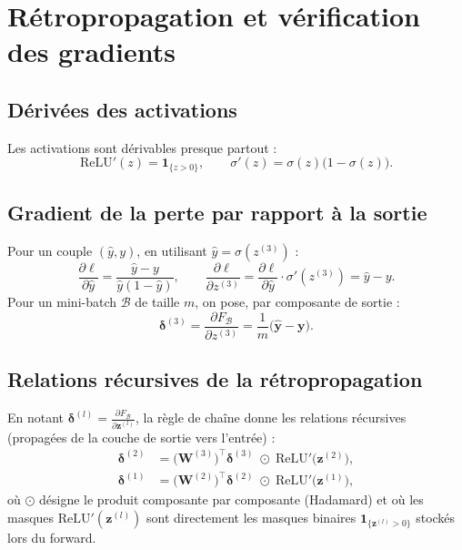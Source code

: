 \documentclass[11pt,a4paper]{article}
\newcommand{\pfrac}[2]{\frac{\partial #1}{\partial #2}}
\newcommand{\vect}[1]{\mathbf{#1}}
\begin{document}
\section{Rétropropagation et vérification des gradients}
\label{sec:backprop}

\subsection{Dérivées des activations}

Les activations sont dérivables presque partout :
\[
\mathrm{ReLU}'(z) = \mathbf{1}_{\{z > 0\}},
\qquad
\sigma'(z) = \sigma(z)\bigl(1 - \sigma(z)\bigr).
\]

\subsection{Gradient de la perte par rapport à la sortie}

Pour un couple $(\hat y, y)$, en utilisant $\hat y = \sigma(z^{(3)})$ :
\[
\frac{\partial \ell}{\partial \hat y} = \frac{\hat y - y}{\hat y (1-\hat y)},
\qquad
\frac{\partial \ell}{\partial z^{(3)}} = \frac{\partial \ell}{\partial \hat y} \cdot \sigma'(z^{(3)}) = \hat y - y .
\]
Pour un mini-batch $\mathcal{B}$ de taille $m$, on pose, par composante de sortie :
\[
\vect{\delta}^{(3)} = \pfrac{F_{\mathcal{B}}}{z^{(3)}} = \frac{1}{m} \bigl( \hat{\vect y} - \vect{y} \bigr).
\]

\subsection{Relations récursives de la rétropropagation}

En notant $\vect{\delta}^{(l)} = \pfrac{F_{\mathcal{B}}}{\vect{z}^{(l)}}$, la règle de chaîne donne les relations récursives (propagées de la couche de sortie vers l'entrée) :
\begin{align}
\vect{\delta}^{(2)} &= \bigl(\vect{W}^{(3)}\bigr)^\top \vect{\delta}^{(3)} \;\odot\; \mathrm{ReLU}'\bigl(\vect{z}^{(2)}\bigr), \label{eq:rec2}\\
\vect{\delta}^{(1)} &= \bigl(\vect{W}^{(2)}\bigr)^\top \vect{\delta}^{(2)} \;\odot\; \mathrm{ReLU}'\bigl(\vect{z}^{(1)}\bigr), \label{eq:rec1}
\end{align}
où $\odot$ désigne le produit composante par composante (Hadamard) et où les masques $\mathrm{ReLU}'(\vect{z}^{(l)})$ sont directement les masques binaires $\mathbf{1}_{\{\vect{z}^{(l)} > 0\}}$ stockés lors du forward.
\end{document}
